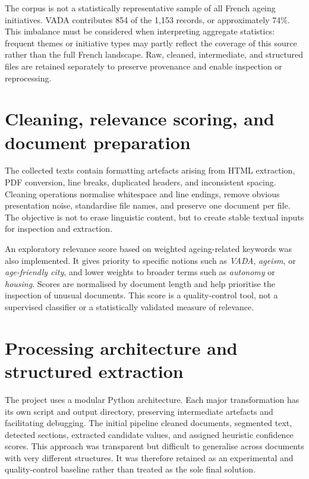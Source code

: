 The corpus is not a statistically representative sample of all French ageing
initiatives. VADA contributes 854 of the 1,153 records, or approximately
74\%. This imbalance must be considered when interpreting aggregate statistics:
frequent themes or initiative types may partly reflect the coverage of this
source rather than the full French landscape. Raw, cleaned, intermediate, and
structured files are retained separately to preserve provenance and enable
inspection or reprocessing.

\section{Cleaning, relevance scoring, and document preparation}

The collected texts contain formatting artefacts arising from HTML extraction,
PDF conversion, line breaks, duplicated headers, and inconsistent spacing.
Cleaning operations normalise whitespace and line endings, remove obvious
presentation noise, standardise file names, and preserve one document per file.
The objective is not to erase linguistic content, but to create stable textual
inputs for inspection and extraction.

An exploratory relevance score based on weighted ageing-related keywords was
also implemented. It gives priority to specific notions such as \textit{VADA},
\textit{ageism}, or \textit{age-friendly city}, and lower weights to broader
terms such as \textit{autonomy} or \textit{housing}. Scores are normalised by
document length and help prioritise the inspection of unusual documents. This
score is a quality-control tool, not a supervised classifier or a statistically
validated measure of relevance.

\section{Processing architecture and structured extraction}

The project uses a modular Python architecture. Each major transformation has
its own script and output directory, preserving intermediate artefacts and
facilitating debugging. The initial pipeline cleaned documents, segmented text,
detected sections, extracted candidate values, and assigned heuristic confidence
scores. This approach was transparent but difficult to generalise across
documents with very different structures. It was therefore retained as an
experimental and quality-control baseline rather than treated as the sole final
solution.

